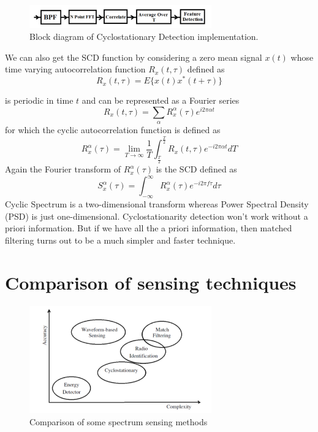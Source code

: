 \begin{figure}
\centering
\includegraphics[width=0.7\textwidth]{csd}
\caption[Cyclostationary Detection implementation]{Block diagram 
of Cyclostationary Detection implementation.}
\label{csd}
\end{figure}

We can also get the SCD function by considering a zero mean signal $x(t)$
whose time varying autocorrelation function $R_x(t,\tau)$ defined as
\cite{prithvi11}
\begin{equation*}
    R_{x}(t,\tau) = E\{x(t)x^{\ast}(t+\tau)\}
\end{equation*}

is periodic in time $t$ and can be represented as a Fourier series
\begin{equation*}
    R_{x}(t,\tau) = \sum_{\alpha}R_{x}^{\alpha}(\tau)e^{i2\pi\alpha t} 
\end{equation*}
for which the cyclic autocorrelation function is defined as
\begin{equation*}
    R_{x}^{\alpha}(\tau) = \lim_{T\rightarrow\infty}{\frac{1}{T}}
    \int_{\frac{T}{2}}^{\frac{T}{2}}R_{x}(t,\tau)e^{-i2\pi\alpha t}dT
\end{equation*}
Again the Fourier transform of $R_{x}^{\alpha}(\tau)$ is the SCD defined as
\begin{equation*}
    S_{x}^{\alpha}(\tau)=\int_{-\infty}^{\infty}R_{x}^{\alpha}(\tau)e^{-i2\pi
    f\tau}d\tau
\end{equation*}
Cyclic Spectrum is a two-dimensional transform whereas Power Spectral Density
(PSD) is just one-dimensional. Cyclostationarity detection won't work without
a priori information. But if we have all the a priori information, then 
matched filtering turns out to be a much simpler and faster technique.

\section{Comparison of sensing techniques}

\begin{figure}
\centering
\includegraphics[width=0.7\textwidth]{compareSensing}
\caption[Comparison of sensing methods]{Comparison of some spectrum sensing 
methods}
\label{compareSensing}
\end{figure}

